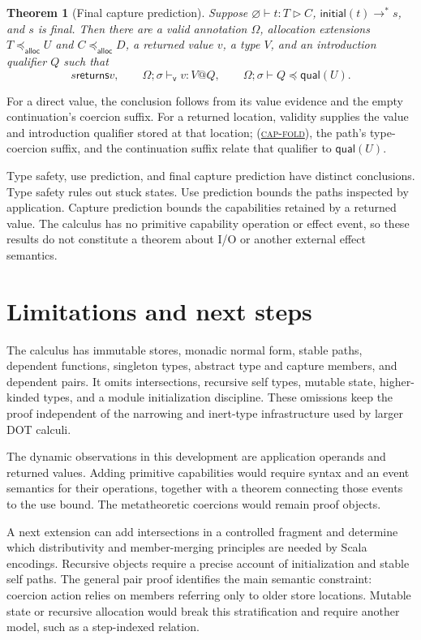 \documentclass[acmsmall,screen,nonacm]{acmart}
\newtheorem{theorem}{Theorem}
\newcommand{\ruleref}[1]{%
  \textsc{(\hyperref[rule:#1]{#1})}}
\newcommand{\ctxempty}{\varnothing}
\newcommand{\uses}{\mathbin{\triangleright}}
\newcommand{\steps}{\longrightarrow^{*}}
\newcommand{\extends}{\mathrel{\preccurlyeq_{\mathsf{alloc}}}}
\newcommand{\semleq}{\mathrel{\preceq}}
\newcommand{\qual}{\mathsf{qual}}
\newcommand{\returns}{\mathrel{\mathsf{returns}}}
\begin{document}
\begin{theorem}[Final capture prediction]
\label{thm:capture-prediction}
Suppose \(\ctxempty\vdash t:T\uses C\),
\(\mathsf{initial}(t)\steps s\), and \(s\) is final.  Then there are a valid
annotation \(\Omega\), allocation extensions \(T\extends U\) and
\(C\extends D\), a returned value \(v\), a type \(V\), and an introduction
qualifier \(Q\) such that
\[
 s\returns v,
 \qquad
 \Omega;\sigma\vdash_{\mathsf v}v:V@Q,
 \qquad
 \Omega;\sigma\vdash Q\semleq\qual(U).
\]
\end{theorem}

For a direct value, the conclusion follows from its value evidence and the
empty continuation's coercion suffix.  For a returned location, validity
supplies the value and introduction qualifier stored at that location;
\ruleref{cap-fold}, the path's type-coercion suffix, and the continuation
suffix relate that qualifier to \(\qual(U)\).

Type safety, use prediction, and final capture prediction have distinct
conclusions.  Type safety rules out stuck states.  Use prediction bounds the
paths inspected by application.  Capture prediction bounds the capabilities
retained by a returned value.  The calculus has no primitive capability
operation or effect event, so these results do not constitute a theorem about
I/O or another external effect semantics.

\section{Limitations and next steps}

The calculus has immutable stores, monadic normal form, stable paths,
dependent functions, singleton types, abstract type and capture members, and
dependent pairs.  It omits intersections, recursive self types, mutable
state, higher-kinded types, and a module initialization discipline.  These
omissions keep the proof independent of the narrowing and inert-type
infrastructure used by larger DOT calculi.

The dynamic observations in this development are application operands and
returned values.  Adding primitive capabilities would require syntax and an
event semantics for their operations, together with a theorem connecting
those events to the use bound.  The metatheoretic coercions would remain proof
objects.

A next extension can add intersections in a controlled fragment and
determine which distributivity and member-merging principles are needed by
Scala encodings.  Recursive objects require a precise account of
initialization and stable self paths.  The general pair proof identifies the
main semantic constraint: coercion action relies on members referring only to
older store locations.  Mutable state or recursive allocation would break
this stratification and require another model, such as a step-indexed
relation.
\end{document}
